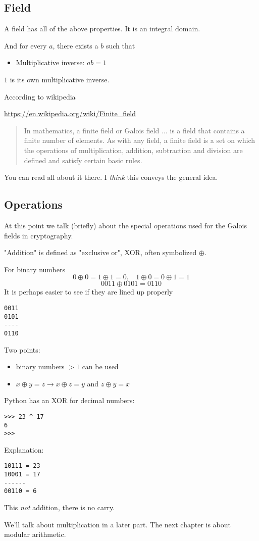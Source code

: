 \documentclass[11pt, oneside]{article}
\begin{document}
\subsection*{Field}
A field has all of the above properties.  It is an integral domain.  

And for every $a$, there exists a $b$ such that

\begin{itemize}
\item Multiplicative inverse:   $ab = 1$
\end{itemize}

$1$ is its own multiplicative inverse.

According to wikipedia

\url{https://en.wikipedia.org/wiki/Finite_field}

\begin{quote}In mathematics, a finite field or Galois field ... is a field that contains a finite number of elements. As with any field, a finite field is a set on which the operations of multiplication, addition, subtraction and division are defined and satisfy certain basic rules.\end{quote}

You can read all about it there.  I \emph{think} this conveys the general idea.

\subsection*{Operations}

At this point we talk (briefly) about the special operations used for the Galois fields in cryptography.  

"Addition" is defined as "exclusive or", XOR, often symbolized $\oplus$.  

For binary numbers
\[ 0 \oplus 0 = 1 \oplus 1 = 0, \ \ \ \ 1 \oplus 0 = 0 \oplus 1 = 1 \]
\[ 0011 \oplus 0101 = 0110 \]
It is perhaps easier to see if they are lined up properly
\begin{verbatim}
0011
0101
----
0110
\end{verbatim}

Two points:
\begin{itemize}
    \item{binary numbers $> 1$ can be used}
    \item{$x \oplus y = z \rightarrow x \oplus z = y$ and $z \oplus y = x$}
\end{itemize}

Python has an XOR for decimal numbers:
\begin{verbatim}
>>> 23 ^ 17
6
>>>
\end{verbatim}

Explanation:
\begin{verbatim}
10111 = 23
10001 = 17
------
00110 = 6
\end{verbatim}

This \emph{not} addition, there is no carry.

We'll talk about multiplication in a later part.  The next chapter is about modular arithmetic.
\end{document}
